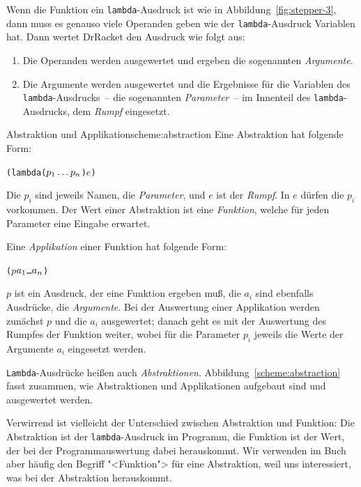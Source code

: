 Wenn die Funktion ein \texttt{lambda}-Ausdruck ist wie in
Abbildung~\ref{fig:stepper-3}, dann muss es genauso viele Operanden
geben wie der \texttt{lambda}-Ausdruck Variablen hat.
Dann wertet DrRacket den Ausdruck wie folgt aus:
%
\begin{enumerate}
\item Die Operanden werden ausgewertet und ergeben die sogenannten
  \textit{Argumente}.
\item Die Argumente werden ausgewertet und die Ergebnisse für die
  Variablen des \texttt{lambda}-Ausdrucks~-- die sogenannten
  \textit{Parameter}~-- im Innenteil des
  \texttt{lambda}-Ausdrucks, dem \textit{Rumpf}
  eingesetzt.
\end{enumerate}
%
\begin{feature}{Abstraktion und Applikation}{scheme:abstraction}
  Eine Abstraktion hat folgende Form:
\begin{alltt}
(lambda (\(p\sb{1} \ldots p\sb{n}\)) \(e\))
\end{alltt}
  Die $p_i$ sind jeweils Namen, die \textit{Parameter}, und
  $e$ ist der \textit{Rumpf}.  In $e$ dürfen die $p_i$
  vorkommen.  Der Wert einer Abstraktion ist eine \textit{Funktion},
  welche für jeden Parameter eine Eingabe erwartet.

  Eine \textit{Applikation} einer Funktion hat folgende Form:
\begin{alltt}
(\(p\) \(a\sb{1}\) \ldots \(a\sb{n}\))
\end{alltt}
  $p$ ist ein Ausdruck, der eine Funktion ergeben muß, die $a_i$ sind
  ebenfalls Ausdrücke, die \textit{Argumente}.  Bei
  der Auswertung einer Applikation werden zunächst $p$ und die $a_i$
  ausgewertet; danach geht es mit der Auswertung des Rumpfes der
  Funktion weiter, wobei für die Parameter $p_i$ jeweils die Werte der
  Argumente $a_i$ eingesetzt werden.
\end{feature}
%
\texttt{Lambda}-Ausdrücke heißen auch
\textit{Abstraktionen}.
Abbildung~\ref{scheme:abstraction} fasst zusammen, wie Abstraktionen
und Applikationen aufgebaut sind und ausgewertet werden.

Verwirrend ist vielleicht der Unterschied zwischen Abstraktion und
Funktion: Die Abstraktion ist der \texttt{lambda}-Ausdruck im
Programm, die Funktion ist der Wert, der bei der Programmauswertung
dabei herauskommt.  Wir verwenden im Buch aber häufig den Begriff
"<Funktion"> für eine Abstraktion, weil uns interessiert, was bei der
Abstraktion herauskommt.

